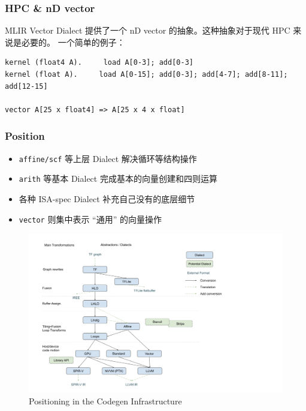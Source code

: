 \documentclass[aspectratio=169]{ctexbeamer}
\begin{document}
\begin{frame}[fragile]
    \frametitle{HPC \& nD vector}
    MLIR Vector Dialect 提供了一个 nD vector 的抽象。这种抽象对于现代 HPC 来说是必要的。
    一个简单的例子：

    \begin{lstlisting}
kernel (float4 A).     load A[0-3]; add[0-3]
kernel (float A).     load A[0-15]; add[0-3]; add[4-7]; add[8-11]; add[12-15]

vector A[25 x float4] => A[25 x 4 x float]
    \end{lstlisting}
\end{frame}



\begin{frame}
    \frametitle{Position}
    \begin{minipage}[t]{0.47\textwidth}
        \small
        \begin{itemize}
            \item \texttt{affine/scf} 等上层 Dialect 解决循环等结构操作
            \item \texttt{arith} 等基本 Dialect 完成基本的向量创建和四则运算
            \item 各种 ISA-spec Dialect 补充自己没有的底层细节
            \item \texttt{vector} 则集中表示 ``通用'' 的向量操作
        \end{itemize}
    \end{minipage}%
    \begin{minipage}[t]{0.5\textwidth}
        \begin{figure}
            \centering
            \includegraphics[width=1.0\linewidth]{images/position.png}
            \caption{Positioning in the Codegen Infrastructure}
        \end{figure}
    \end{minipage}
\end{frame}
\end{document}
